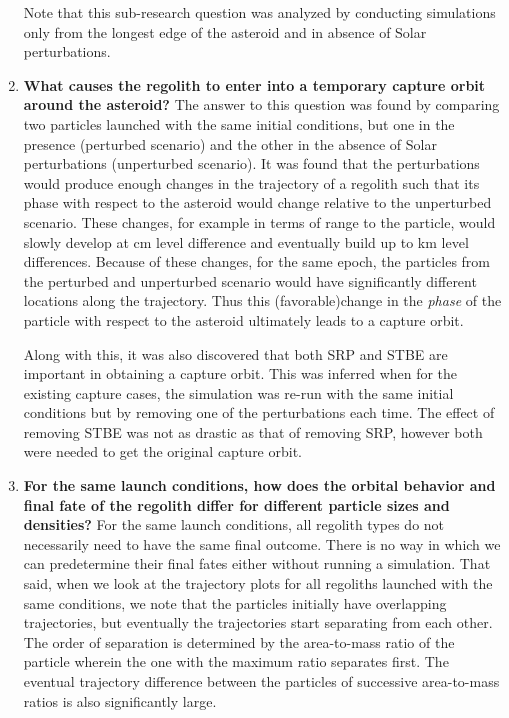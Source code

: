 \begin{enumerate}
Note that this sub-research question was analyzed by conducting simulations only from the longest edge of the asteroid and in absence of Solar perturbations.

\item \textbf{What causes the regolith to enter into a temporary capture orbit around the asteroid?}\newline
The answer to this question was found by comparing two particles launched with the same initial conditions, but one in the presence (perturbed scenario) and the other in the absence of Solar perturbations (unperturbed scenario). It was found that the perturbations would produce enough changes in the trajectory of a regolith such that its phase with respect to the asteroid would change relative to the unperturbed scenario. These changes, for example in terms of range to the particle, would slowly develop at cm level difference and eventually build up to km level differences. Because of these changes, for the same epoch, the particles from the perturbed and unperturbed scenario would have significantly different locations along the trajectory. Thus this (favorable)change in the \emph{phase} of the particle with respect to the asteroid ultimately leads to a capture orbit.

Along with this, it was also discovered that both \gls{SRP} and \gls{STBE} are important in obtaining a capture orbit. This was inferred when for the existing capture cases, the simulation was re-run with the same initial conditions but by removing one of the perturbations each time. The effect of removing \gls{STBE} was not as drastic as that of removing \gls{SRP}, however both were needed to get the original capture orbit.

\item \textbf{For the same launch conditions, how does the orbital behavior and final fate of the regolith differ for different particle sizes and densities?}\newline
For the same launch conditions, all regolith types do not necessarily need to have the same final outcome. There is no way in which we can predetermine their final fates either without running a simulation. That said, when we look at the trajectory plots for all regoliths launched with the same conditions, we note that the particles initially have overlapping trajectories, but eventually the trajectories start separating from each other. The order of separation is determined by the area-to-mass ratio of the particle wherein the one with the maximum ratio separates first. The eventual trajectory difference between the particles of successive area-to-mass ratios is also significantly large.


\end{enumerate}
